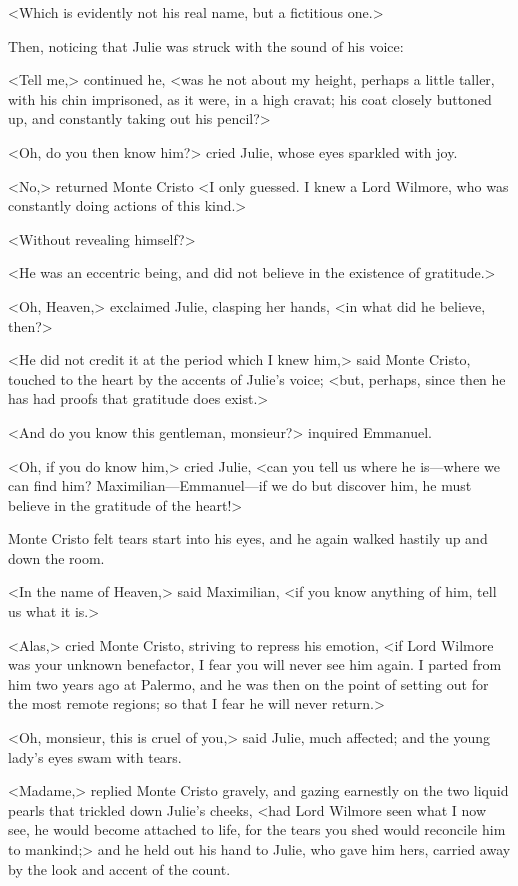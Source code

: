  <Which is evidently not his real name, but a fictitious one.> 

 Then, noticing that Julie was struck with the sound of his voice: 

 <Tell me,> continued he, <was he not about my height, perhaps a little taller, with his chin imprisoned, as it were, in a high cravat; his coat closely buttoned up, and constantly taking out his pencil?> 

 <Oh, do you then know him?> cried Julie, whose eyes sparkled with joy. 

 <No,> returned Monte Cristo <I only guessed. I knew a Lord Wilmore, who was constantly doing actions of this kind.> 

 <Without revealing himself?> 

 <He was an eccentric being, and did not believe in the existence of gratitude.> 

 <Oh, Heaven,> exclaimed Julie, clasping her hands, <in what did he believe, then?>

<He did not credit it at the period which I knew him,> said Monte Cristo, touched to the heart by the accents of Julie's voice; <but, perhaps, since then he has had proofs that gratitude does exist.> 

 <And do you know this gentleman, monsieur?> inquired Emmanuel. 

 <Oh, if you do know him,> cried Julie, <can you tell us where he is—where we can find him? Maximilian—Emmanuel—if we do but discover him, he must believe in the gratitude of the heart!> 

 Monte Cristo felt tears start into his eyes, and he again walked hastily up and down the room. 

 <In the name of Heaven,> said Maximilian, <if you know anything of him, tell us what it is.> 

 <Alas,> cried Monte Cristo, striving to repress his emotion, <if Lord Wilmore was your unknown benefactor, I fear you will never see him again. I parted from him two years ago at Palermo, and he was then on the point of setting out for the most remote regions; so that I fear he will never return.> 

 <Oh, monsieur, this is cruel of you,> said Julie, much affected; and the young lady's eyes swam with tears. 

 <Madame,> replied Monte Cristo gravely, and gazing earnestly on the two liquid pearls that trickled down Julie's cheeks, <had Lord Wilmore seen what I now see, he would become attached to life, for the tears you shed would reconcile him to mankind;> and he held out his hand to Julie, who gave him hers, carried away by the look and accent of the count. 

